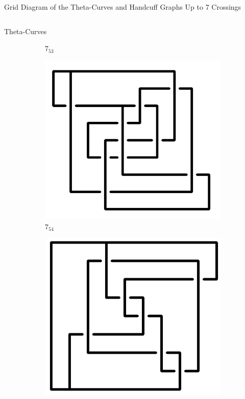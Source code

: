 \documentclass[final]{beamer}
\begin{document}
\begin{frame}[t]
\begin{alertblock}{Grid Diagram of the Theta-Curves and Handcuff Graphs Up to 7 Crossings}
\begin{columns}[t]
\begin{column}{0.5\textwidth}
\begin{alertblock}{Theta-Curves}
\begin{figure}
\begin{subfigure}{0.075\textwidth}
    \caption{$7_{53}$} 
    \end{subfigure}
    \begin{subfigure}{0.075\textwidth}
    \includegraphics[width=\columnwidth]{../Midterm_Poster/grid_diagram/theta_7_54.png}
    \caption{$7_{54}$} 
    \end{subfigure}
    \begin{subfigure}{0.075\textwidth}
    \includegraphics[width=\columnwidth]{../Midterm_Poster/grid_diagram/theta_7_55.png}

\end{subfigure}
\end{figure}
\end{alertblock}
\end{column}
\end{columns}
\end{alertblock}
\end{frame}
\end{document}
